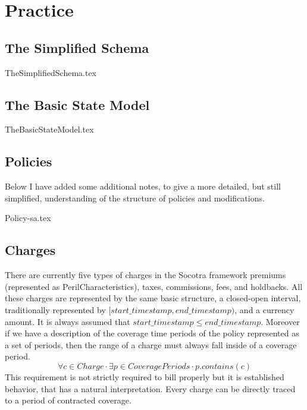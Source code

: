 \chapter{Practice}
\label{intro:03} %


\section{The Simplified Schema}
\label{sec:03:1}
{TheSimplifiedSchema.tex}

\section{The Basic State Model}
\label{sec:03:2}
{TheBasicStateModel.tex}

\section{Policies}
\label{sec:03:3}
Below I have added some additional notes, to give a more detailed, but still simplified, understanding of
the structure of policies and modifications.

{Policy-sa.tex}

\section{Charges}
\label{sec:03:6}

There are currently five types of charges in the Socotra framework premiums (represented as PerilCharacteristics), taxes,
commissions, fees, and holdbacks. All these charges are represented by the same basic structure, a closed-open
interval, traditionally represented by $[start\_timestamp, end\_timestamp)$, and a currency amount. It is
always assumed that $start\_timestamp \leq end\_timestamp$. Moreover if we have a description of the
coverage time periods of the policy represented as a set of periods, then the range of a charge must always
fall inside of a coverage period.
\begin{equation*}
\forall c \in Charge \cdot \exists p \in CoveragePeriods \cdot p.contains(c)
\end{equation*}
This requirement is not strictly required to bill properly but it is established behavior, that has a natural
interpretation. Every charge can be directly traced to a period of contracted coverage.

